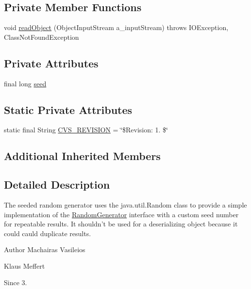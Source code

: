 \subsection*{Private Member Functions}
\begin{DoxyCompactItemize}
\item 
void \hyperlink{classorg_1_1jgap_1_1impl_1_1_seeded_random_generator_ac015e5a0539bf33e04dc37c96a684430}{read\-Object} (Object\-Input\-Stream a\-\_\-input\-Stream)  throws I\-O\-Exception, Class\-Not\-Found\-Exception 
\end{DoxyCompactItemize}
\subsection*{Private Attributes}
\begin{DoxyCompactItemize}
\item 
final long \hyperlink{classorg_1_1jgap_1_1impl_1_1_seeded_random_generator_ae7446837a948e934a4f9a284d485e698}{seed}
\end{DoxyCompactItemize}
\subsection*{Static Private Attributes}
\begin{DoxyCompactItemize}
\item 
static final String \hyperlink{classorg_1_1jgap_1_1impl_1_1_seeded_random_generator_a7af667512d1d22347bada77695a5ee55}{C\-V\-S\-\_\-\-R\-E\-V\-I\-S\-I\-O\-N} = \char`\"{}\$Revision\-: 1. \$\char`\"{}
\end{DoxyCompactItemize}
\subsection*{Additional Inherited Members}


\subsection{Detailed Description}
The seeded random generator uses the java.\-util.\-Random class to provide a simple implementation of the \hyperlink{interfaceorg_1_1jgap_1_1_random_generator}{Random\-Generator} interface with a custom seed number for repeatable results. It shouldn't be used for a deserializing object because it could cauld duplicate results.

\begin{DoxyAuthor}{Author}
Machairas Vasileios 

Klaus Meffert 
\end{DoxyAuthor}
\begin{DoxySince}{Since}
3. 
\end{DoxySince}


